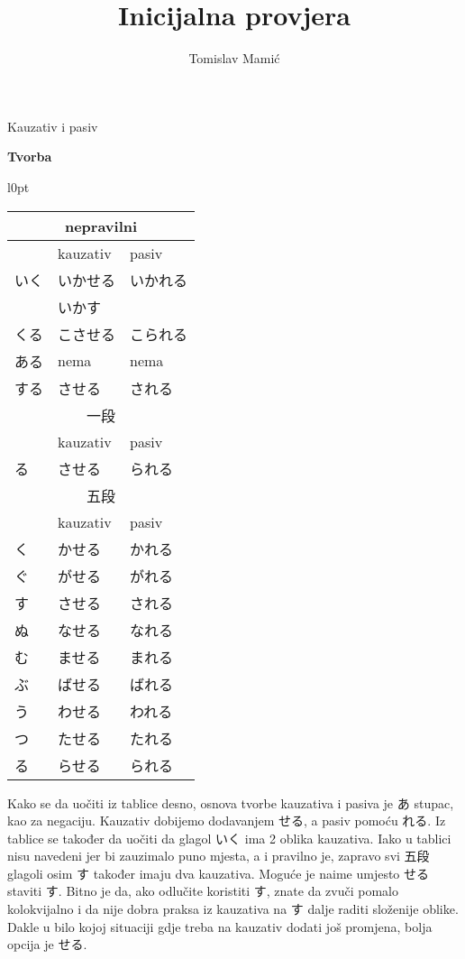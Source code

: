 \documentclass[12pt]{article}
\author{Tomislav Mamić}
\title{Inicijalna provjera}
\begin{document}
	\large Kauzativ i pasiv
	
	\vspace{20pt}
	\normalsize \textbf{Tvorba}
	\vspace{20pt}

\begin{wraptable}[22]{l}{0pt}
	\begin{tabular}{|l|l|l|}
		\hline
		\multicolumn{3}{|c|}{nepravilni}\\
		\hline
		&kauzativ&pasiv\\
		\hline
		いく&いかせる&いかれる\\
		&いかす&\\
		くる&こさせる&こられる\\
		ある&nema\footnotemark[1]&nema\footnotemark[1]\\
		する&させる&される\\
		\hline
		\hline
		\multicolumn{3}{|c|}{一段}\\
		\hline
		&kauzativ&pasiv\\
		\hline
		る&させる&られる\footnotemark[2]\\
		\hline
		\hline
		\multicolumn{3}{|c|}{五段}\\
		\hline
		&kauzativ&pasiv\\
		\hline
		く&かせる&かれる\\
		ぐ&がせる&がれる\\
		す&させる&される\\
		\hline
		ぬ&なせる&なれる\\
		む&ませる&まれる\\
		ぶ&ばせる&ばれる\\
		\hline
		う&わせる&われる\\
		つ&たせる&たれる\\
		る&らせる&られる\\
		\hline
	\end{tabular}
\end{wraptable}

	Kako se da uočiti iz tablice desno, osnova tvorbe kauzativa i pasiva je あ stupac, kao za negaciju. Kauzativ dobijemo dodavanjem せる, a pasiv pomoću れる. Iz tablice se također da uočiti da glagol いく ima 2 oblika kauzativa. Iako u tablici nisu navedeni jer bi zauzimalo puno mjesta, a i pravilno je, zapravo svi 五段 glagoli osim す također imaju dva kauzativa. Moguće je naime umjesto せる staviti す. Bitno je da, ako odlučite koristiti す, znate da zvuči pomalo kolokvijalno i da nije dobra praksa iz kauzativa na す dalje raditi složenije oblike. Dakle u bilo kojoj situaciji gdje treba na kauzativ dodati još promjena, bolja opcija je せる.
	
\end{document}
